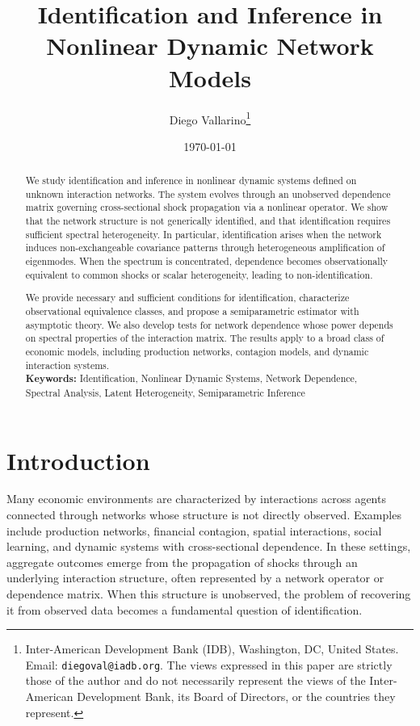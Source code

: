 \documentclass[12pt]{article}
\title{Identification and Inference in Nonlinear Dynamic Network Models}
\author{Diego Vallarino\thanks{{\fontsize{10}{12}\selectfont
Inter-American Development Bank (IDB),
Washington, DC, United States. Email: \texttt{diegoval@iadb.org}. 
The views expressed in this paper are strictly those of the author and do not necessarily represent the views of the Inter-American Development Bank, its Board of Directors, or the countries they represent.}}
\vspace{0.6cm}
}
\date{\small \today}
\numberwithin{equation}{section}
\begin{document}
\maketitle
\thispagestyle{empty}

\begin{abstract}
\begin{singlespace}

We study identification and inference in nonlinear dynamic systems defined on unknown interaction networks. The system evolves through an unobserved dependence matrix governing cross-sectional shock propagation via a nonlinear operator. We show that the network structure is not generically identified, and that identification requires sufficient spectral heterogeneity. In particular, identification arises when the network induces non-exchangeable covariance patterns through heterogeneous amplification of eigenmodes. When the spectrum is concentrated, dependence becomes observationally equivalent to common shocks or scalar heterogeneity, leading to non-identification.

We provide necessary and sufficient conditions for identification, characterize observational equivalence classes, and propose a semiparametric estimator with asymptotic theory. We also develop tests for network dependence whose power depends on spectral properties of the interaction matrix. The results apply to a broad class of economic models, including production networks, contagion models, and dynamic interaction systems.\\

\textbf{Keywords:} Identification, Nonlinear Dynamic Systems, Network Dependence, Spectral Analysis, Latent Heterogeneity, Semiparametric Inference

\end{singlespace}
\end{abstract}

\section{Introduction}

Many economic environments are characterized by interactions across agents connected through networks whose structure is not directly observed. Examples include production networks, financial contagion, spatial interactions, social learning, and dynamic systems with cross-sectional dependence. In these settings, aggregate outcomes emerge from the propagation of shocks through an underlying interaction structure, often represented by a network operator or dependence matrix. When this structure is unobserved, the problem of recovering it from observed data becomes a fundamental question of identification.
\end{document}
